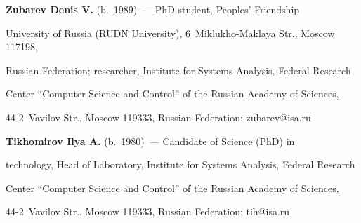 \vspace*{3pt}





\noindent

\textbf{Zubarev Denis  V.} (b.\ 1989)~--- PhD student, Peoples' Friendship 

University of Russia (RUDN University), 6~Miklukho-Maklaya Str., Moscow 117198, 

Russian Federation; researcher, Institute for Systems Analysis, Federal Research 

Center ``Computer Science and Control'' of the Russian Academy of Sciences, 

44-2~Vavilov Str., Moscow 119333, Russian Federation; \mbox{zubarev@isa.ru}



\vspace*{3pt}



\noindent

\textbf{Tikhomirov Ilya A.} (b.\ 1980)~--- Candidate of Science (PhD) in 

technology, Head of Laboratory, Institute for Systems Analysis, Federal Research 

Center ``Computer Science and Control'' of the Russian Academy of Sciences, 

44-2~Vavilov Str., Moscow 119333, Russian Federation; \mbox{tih@isa.ru}



     

\label{end\stat}





\renewcommand{\bibname}{\protect\rm Литература} 

